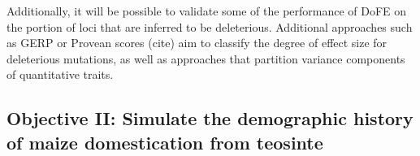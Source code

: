 




	


 Additionally, it will be possible to validate some of the performance of DoFE on the portion of loci that are inferred to be deleterious. Additional approaches such as GERP or Provean scores (cite) aim to classify the degree of effect size for deleterious mutations, as well as approaches that partition variance components of quantitative traits.
	
	
	
	
\subsection*{Objective II: Simulate the demographic history of maize domestication from teosinte}

